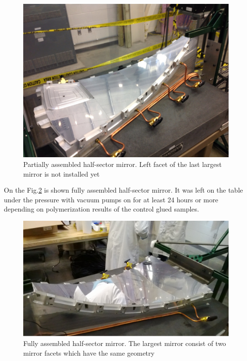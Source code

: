 \begin{figure}[h]
    \centering
    \includegraphics[width=1.0\linewidth]{images/Partial_Half-sector.png}
    \caption{Partially assembled half-sector mirror. Left facet of the last largest mirror is not installed yet}
    \label{fig:Partial_Half-sector}
\end{figure} 
On the Fig.\ref{fig:Half-sector} is shown fully assembled half-sector mirror. It was left on the table under the pressure with vacuum pumps on for at least 24 hours or more depending on polymerization results of the control glued samples. 

\begin{figure}[h]
    \centering
    \includegraphics[width=1.0\linewidth]{images/Half-sector.png}
    \caption{Fully assembled half-sector mirror. The largest mirror consist of two mirror facets which have the same geometry}
    \label{fig:Half-sector}
\end{figure}

